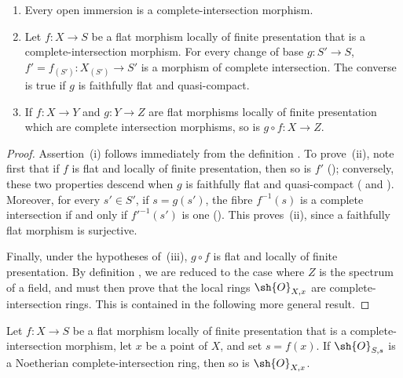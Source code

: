 \begin{proposition}[19.3.9]
\label{IV.19.3.9}
\medskip\noindent
\begin{enumerate}[label=(\roman*)]
  \item Every open immersion is a complete-intersection morphism.
  \item Let $f:X\to S$ be a flat morphism locally of finite presentation that is a complete-intersection morphism.
For every change of base $g:S'\to S$, $f'=f_{(S')}:X_{(S')}\to S'$ is a morphism of complete intersection.
The converse is true if $g$ is faithfully flat and quasi-compact.
  \item If $f:X\to Y$ and $g:Y\to Z$ are flat morphisms locally of finite presentation which are complete intersection morphisms, so is $g\circ f:X\to Z$.
\end{enumerate}
\end{proposition}

\begin{proof}
Assertion~(i) follows immediately from the definition .
To prove~(ii), note first that if $f$ is flat and locally of finite presentation, then so is $f'$ (); conversely, these two properties descend when $g$ is faithfully flat and quasi-compact ( and ). Moreover, for every $s'\in S'$, if $s=g(s')$, the fibre $f^{-1}(s)$ is a complete intersection if and only if $f'^{-1}(s')$ is one (). This proves~(ii), since a faithfully flat morphism is surjective.

Finally, under the hypotheses of~(iii), $g\circ f$ is flat and locally of finite presentation.
By definition , we are reduced to the case where $Z$ is the spectrum of a field, and must then prove that the local rings $\sh{O}_{X,x}$ are complete-intersection rings. This is contained in the following more general result.
\end{proof}

\begin{corollary}[19.3.10]
\label{IV.19.3.10}
Let $f:X\to S$ be a flat morphism locally of finite presentation that is a complete-intersection morphism, let $x$ be a point of $X$, and set $s=f(x)$.
If $\sh{O}_{S,s}$ is a Noetherian complete-intersection ring, then so is $\sh{O}_{X,x}$.
\end{corollary}

